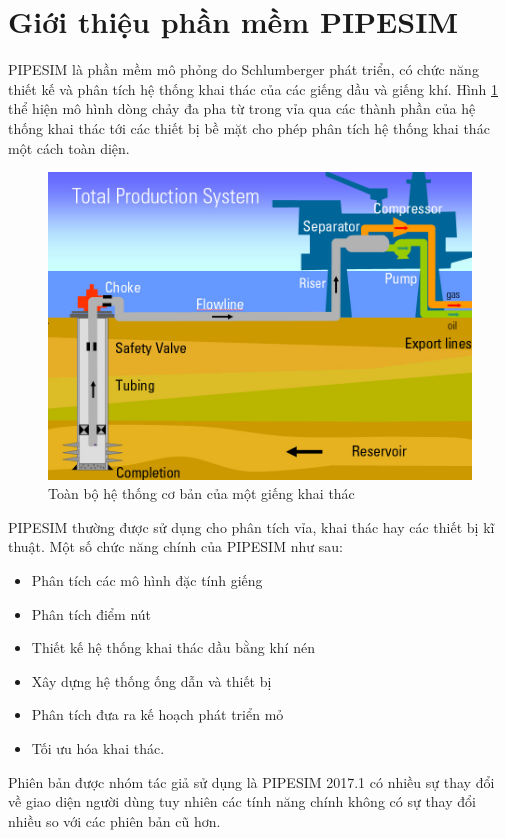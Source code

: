 \documentclass[12pt,a4paper]{report}
\begin{document}
\section{Giới thiệu phần mềm PIPESIM}
PIPESIM là phần mềm mô phỏng do Schlumberger phát triển, có chức năng thiết kế và phân tích hệ thống khai thác của các giếng dầu và giếng khí. Hình \ref{fig:production_system} \cite{schlum2010pipesim} thể hiện mô hình dòng chảy đa pha từ trong vỉa qua các thành phần của hệ thống khai thác tới các thiết bị bề mặt cho phép phân tích hệ thống khai thác một cách toàn diện.
	\begin{figure}[h]
		\centering
		\includegraphics[scale=0.6]{Fig/production_system.png}
		\caption{Toàn bộ hệ thống cơ bản của một giếng khai thác}
		\label{fig:production_system}
	\end{figure}
\newline
PIPESIM thường được sử dụng cho phân tích vỉa, khai thác hay các thiết bị kĩ thuật. Một số chức năng chính của PIPESIM như sau:
	\begin{itemize}
		\item Phân tích các mô hình đặc tính giếng
		\item Phân tích điểm nút
		\item Thiết kế hệ thống khai thác dầu bằng khí nén
		\item Xây dựng hệ thống ống dẫn và thiết bị
		\item Phân tích đưa ra kế hoạch phát triển mỏ
		\item Tối ưu hóa khai thác.
	\end{itemize}
Phiên bản được nhóm tác giả sử dụng là PIPESIM 2017.1 có nhiều sự thay đổi về giao diện người dùng tuy nhiên các tính năng chính không có sự thay đổi nhiều so với các phiên bản cũ hơn.
\end{document}
